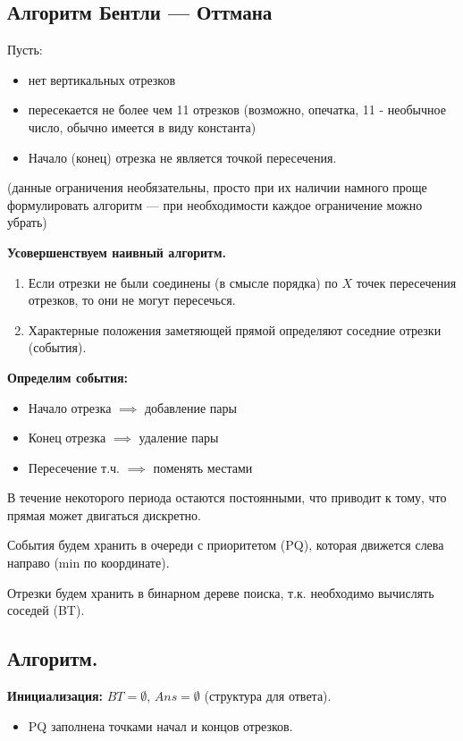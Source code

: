 \subsection{Алгоритм Бентли --- Оттмана}

Пусть:
\begin{itemize}
	\item нет вертикальных отрезков 
	\item пересекается не более чем 11 отрезков (возможно, опечатка, 11 - необычное число, обычно имеется в виду константа) 
	\item Начало (конец) отрезка не является точкой пересечения. 
\end{itemize}
(данные ограничения необязательны, просто при их наличии намного проще формулировать алгоритм --- при необходимости каждое ограничение можно убрать)

\textbf{Усовершенствуем наивный алгоритм.}
\begin{enumerate}
	\item Если отрезки не были соединены (в смысле порядка) по $X$ точек пересечения отрезков, то они не могут пересечься. 
	\item Характерные положения заметяющей прямой определяют соседние отрезки (события). 
\end{enumerate}

\textbf{Определим события:} 
\begin{itemize}
	\item Начало отрезка $\implies$ добавление пары 
	\item Конец отрезка $\implies$ удаление пары 
	\item Пересечение т.ч. $\implies$ поменять местами 
\end{itemize}
В течение некоторого периода остаются постоянными, что приводит к тому, что прямая может двигаться дискретно. 

События будем хранить в очереди с приоритетом (PQ), которая движется слева направо (min по координате). 

Отрезки будем хранить в бинарном дереве поиска, т.к. необходимо вычислять соседей (BT). 

\subsection*{Алгоритм.}

\textbf{Инициализация:} $BT = \emptyset$, $Ans = \emptyset$ (структура для ответа). 
\begin{itemize}
	\item PQ заполнена точками начал и концов отрезков. 
\end{itemize}

